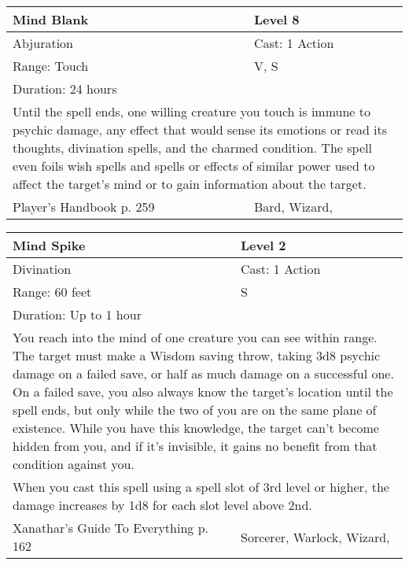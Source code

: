 \documentclass[11pt]{report}
\begin{document}
\begin{table}[H]
	\begin{tabular}{||p{6cm}|p{6cm}||}
		\hline\hline
		\bf{Mind Blank} & Level 8\\ \hline
		Abjuration & Cast: 1 Action\\ \hline
		Range: Touch & V, S\\ \hline
		Duration: 24 hours & \\ \hline
		\multicolumn{2}{||p{12cm}||}{Until the spell ends, one willing creature you touch is immune to psychic damage, any effect that would sense its emotions or read its thoughts, divination spells, and the charmed condition. The spell even foils wish spells and spells or effects of similar power used to affect the target’s mind or to gain information about the target.}\\ \hline
Player's Handbook p. 259 & Bard, Wizard, \\ \hline\hline
	\end{tabular}
\end{table}

\begin{table}[H]
	\begin{tabular}{||p{6cm}|p{6cm}||}
		\hline\hline
		\bf{Mind Spike} & Level 2\\ \hline
		Divination & Cast: 1 Action\\ \hline
		Range: 60 feet & S\\ \hline
		Duration: Up to 1 hour & \\ \hline
		\multicolumn{2}{||p{12cm}||}{You reach into the mind of one creature you can see within range. The target must make a Wisdom saving throw, taking 3d8 psychic damage on a failed save, or half as much damage on a successful one. On a failed save, you also always know the target's location until the spell ends, but only while the two of you are on the same plane of existence. While you have this knowledge, the target can’t become hidden from you, and if it’s invisible, it gains no benefit from that condition against you.}\\ \hline
		\multicolumn{2}{||p{12cm}||}{When you cast this spell using a spell slot of 3rd level or higher, the damage increases by 1d8 for each slot level above 2nd.}\\ \hline
Xanathar's Guide To Everything p. 162 & Sorcerer, Warlock, Wizard, \\ \hline\hline
	\end{tabular}
\end{table}
\end{document}
